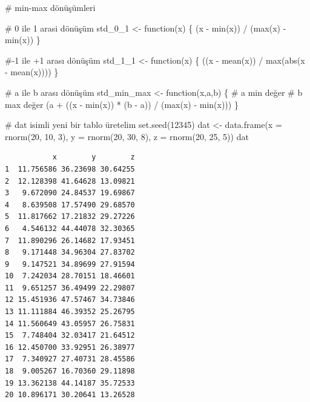 \documentclass[
  letterpaper,
  DIV=11,
  numbers=noendperiod]{scrreprt}
\newenvironment{Shaded}{\begin{snugshade}}{\end{snugshade}}
\newcommand{\AttributeTok}[1]{\textcolor[rgb]{0.40,0.45,0.13}{#1}}
\newcommand{\CommentTok}[1]{\textcolor[rgb]{0.37,0.37,0.37}{#1}}
\newcommand{\ControlFlowTok}[1]{\textcolor[rgb]{0.00,0.23,0.31}{#1}}
\newcommand{\DecValTok}[1]{\textcolor[rgb]{0.68,0.00,0.00}{#1}}
\newcommand{\FunctionTok}[1]{\textcolor[rgb]{0.28,0.35,0.67}{#1}}
\newcommand{\NormalTok}[1]{\textcolor[rgb]{0.00,0.23,0.31}{#1}}
\newcommand{\OtherTok}[1]{\textcolor[rgb]{0.00,0.23,0.31}{#1}}
\newcommand{\SpecialCharTok}[1]{\textcolor[rgb]{0.37,0.37,0.37}{#1}}
\begin{document}
\begin{Shaded}
\begin{Highlighting}[]
\CommentTok{\# min{-}max dönüşümleri}

\CommentTok{\# 0 ile 1 arasi dönüşüm}
\NormalTok{std\_0\_1 }\OtherTok{\textless{}{-}} \ControlFlowTok{function}\NormalTok{(x) \{}
\NormalTok{  (x }\SpecialCharTok{{-}} \FunctionTok{min}\NormalTok{(x)) }\SpecialCharTok{/}\NormalTok{ (}\FunctionTok{max}\NormalTok{(x) }\SpecialCharTok{{-}} \FunctionTok{min}\NormalTok{(x))}
\NormalTok{\}}

\CommentTok{\#{-}1 ile +1 arası dönüşüm }
\NormalTok{std\_1\_1 }\OtherTok{\textless{}{-}} \ControlFlowTok{function}\NormalTok{(x) \{}
\NormalTok{  ((x }\SpecialCharTok{{-}} \FunctionTok{mean}\NormalTok{(x)) }\SpecialCharTok{/} \FunctionTok{max}\NormalTok{(}\FunctionTok{abs}\NormalTok{(x }\SpecialCharTok{{-}} \FunctionTok{mean}\NormalTok{(x))))}
\NormalTok{\}}

\CommentTok{\# a ile b arası dönüşüm }
\NormalTok{std\_min\_max }\OtherTok{\textless{}{-}} \ControlFlowTok{function}\NormalTok{(x,a,b) \{}
  \CommentTok{\# a min değer}
  \CommentTok{\# b max değer}
\NormalTok{  (a }\SpecialCharTok{+}\NormalTok{ ((x }\SpecialCharTok{{-}} \FunctionTok{min}\NormalTok{(x)) }\SpecialCharTok{*}\NormalTok{ (b }\SpecialCharTok{{-}}\NormalTok{ a)) }\SpecialCharTok{/}\NormalTok{ (}\FunctionTok{max}\NormalTok{(x) }\SpecialCharTok{{-}} \FunctionTok{min}\NormalTok{(x)))}
\NormalTok{\}}

\CommentTok{\# dat isimli yeni bir tablo üretelim}
\FunctionTok{set.seed}\NormalTok{(}\DecValTok{12345}\NormalTok{)}
\NormalTok{dat }\OtherTok{\textless{}{-}} \FunctionTok{data.frame}\NormalTok{(}\AttributeTok{x =} \FunctionTok{rnorm}\NormalTok{(}\DecValTok{20}\NormalTok{, }\DecValTok{10}\NormalTok{, }\DecValTok{3}\NormalTok{),}
                  \AttributeTok{y =} \FunctionTok{rnorm}\NormalTok{(}\DecValTok{20}\NormalTok{, }\DecValTok{30}\NormalTok{, }\DecValTok{8}\NormalTok{),}
                  \AttributeTok{z =} \FunctionTok{rnorm}\NormalTok{(}\DecValTok{20}\NormalTok{, }\DecValTok{25}\NormalTok{, }\DecValTok{5}\NormalTok{))}
\NormalTok{dat}
\end{Highlighting}
\end{Shaded}

\begin{verbatim}
           x        y        z
1  11.756586 36.23698 30.64255
2  12.128398 41.64628 13.09821
3   9.672090 24.84537 19.69867
4   8.639508 17.57490 29.68570
5  11.817662 17.21832 29.27226
6   4.546132 44.44078 32.30365
7  11.890296 26.14682 17.93451
8   9.171448 34.96304 27.83702
9   9.147521 34.89699 27.91594
10  7.242034 28.70151 18.46601
11  9.651257 36.49499 22.29807
12 15.451936 47.57467 34.73846
13 11.111884 46.39352 25.26795
14 11.560649 43.05957 26.75831
15  7.748404 32.03417 21.64512
16 12.450700 33.92951 26.38977
17  7.340927 27.40731 28.45586
18  9.005267 16.70360 29.11898
19 13.362138 44.14187 35.72533
20 10.896171 30.20641 13.26528
\end{verbatim}
\end{document}
